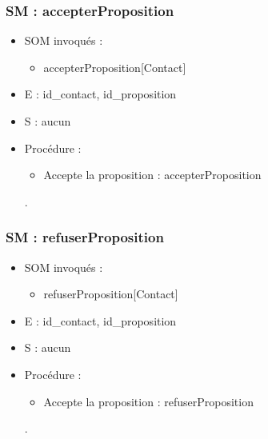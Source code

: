 \subsubsection{SM : accepterProposition}
\begin{itemize}
	\item SOM invoqués :
	\begin{itemize}
		\item accepterProposition[Contact]
	\end{itemize}
	\item E : id\_contact, id\_proposition
	\item S : aucun
	\item Procédure :
	\begin{itemize}
		\item Accepte la proposition : accepterProposition
	\end{itemize}.
\end{itemize}

\subsubsection{SM : refuserProposition}
\begin{itemize}
	\item SOM invoqués :
	\begin{itemize}
		\item refuserProposition[Contact]
	\end{itemize}
	\item E : id\_contact, id\_proposition
	\item S : aucun
	\item Procédure :
	\begin{itemize}
		\item Accepte la proposition : refuserProposition
	\end{itemize}.
\end{itemize}

